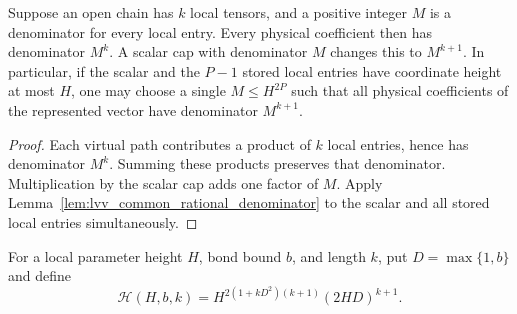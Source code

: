 \begin{lemma}
    \label{lem:lvv_open_chain_common_denominator}
    \leanok
    Suppose an open chain has $k$ local tensors, and a positive integer
    $M$ is a denominator for every local entry. Every physical coefficient
    then has denominator $M^k$. A scalar cap with denominator $M$ changes
    this to $M^{k+1}$.
    In particular, if the scalar and the $P-1$ stored local entries have
    coordinate height at most $H$, one may choose a single
    $M\le H^{2P}$ such that all physical coefficients of the represented
    vector have denominator $M^{k+1}$.
\end{lemma}
\begin{proof}\leanok
    Each virtual path contributes a product of $k$ local entries, hence
    has denominator $M^k$. Summing these products preserves that
    denominator. Multiplication by the scalar cap adds one factor of
    $M$. Apply Lemma~\ref{lem:lvv_common_rational_denominator} to the
    scalar and all stored local entries simultaneously.
\end{proof}

\begin{definition}
    \label{def:lvv_contracted_height_bound}
    \leanok
    For a local parameter height $H$, bond bound $b$, and length $k$, put
    $D=\max\{1,b\}$ and define
    \[
        \mathcal H(H,b,k)
        =H^{2(1+kD^2)(k+1)}(2HD)^{k+1}.
    \]
\end{definition}

